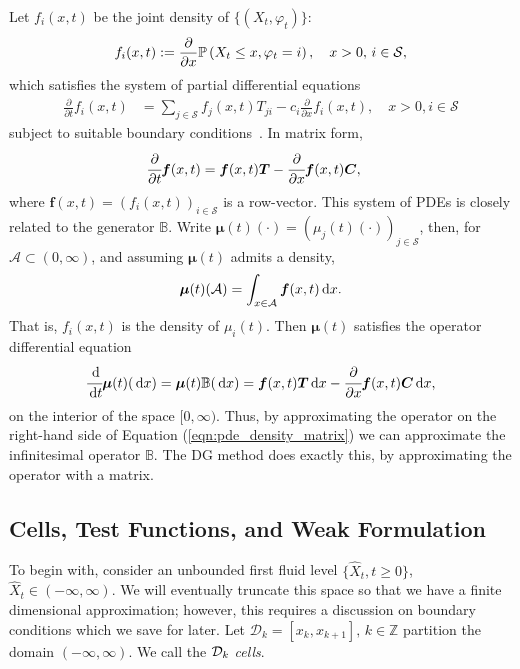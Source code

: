 Let $f_i(x,t)$ be the joint density of $\{(X_t, \varphi_t)\}$: 
	\begin{align*} 
	    f_i(x,t) := \frac{\partial}{\partial x} 	\mathbb{P}\left(X_t \leq x, \varphi_t = i\right),\quad x>0,\, i \in\mathcal{S},
	\end{align*} 
which satisfies the system of partial differential equations 
%
\begin{align*}
\frac{\partial}{\partial t} f_i(x,t)& = \sum_{j\in \mathcal{S}}  f_j(x,t)T_{ji} - c_i \frac{\partial}{\partial x} f_i(x,t), \quad x>0, i\in\mathcal S
\end{align*}
% 
subject to suitable boundary conditions~\citep{bo2014}. In matrix form, 
\begin{align}
\cfrac{\partial}{\partial t} \boldsymbol f(x,t) &= \boldsymbol f(x,t)\boldsymbol T -  \cfrac{\partial}{\partial x}\boldsymbol f(x,t)\boldsymbol C\label{eqn:pde_density_matrix}, 
\end{align}
where \(\boldsymbol f(x,t) = \left(f_i(x,t)\right)_{i\in\mathcal S}\) is a row-vector. 
This system of PDEs is closely related to the generator \(\mathbb B\). Write \(\boldsymbol \mu(t)(\cdot) = (\mu_j(t)(\cdot))_{j\in\mathcal S}\), then, for \(\mathcal A\subset (0,\infty)\), and assuming \(\boldsymbol \mu(t)\) admits a density, 
\begin{align*}
	\boldsymbol \mu(t)(\mathcal A) = \int_{x\in\mathcal A}\boldsymbol f(x,t)\, \mathrm{d} x.
\end{align*}
That is, \(f_i(x,t)\) is the density of \(\mu_i(t)\). 
Then \(\boldsymbol \mu(t)\) satisfies the operator differential equation
\begin{align*}
	\cfrac{\, \mathrm{d}}{\, \mathrm{d} t}\boldsymbol \mu(t)(\, \mathrm{d} x) = \boldsymbol \mu(t)\mathbb B(\, \mathrm{d} x) = \boldsymbol f(x,t)\boldsymbol T\, \mathrm{d} x - \cfrac{\partial}{\partial x}\boldsymbol f(x,t)\boldsymbol C\, \mathrm{d} x,
\end{align*}
on the interior of the space \([0,\infty)\). Thus, by approximating the operator on the right-hand side of Equation (\ref{eqn:pde_density_matrix}) we can approximate the infinitesimal operator \(\mathbb B\). The DG method does exactly this, by approximating the operator with a matrix.

\subsection{Cells, Test Functions, and Weak Formulation}
To begin with, consider an unbounded first fluid level \(\{\widehat X_t,t\geq0\}\), \(\widehat X_t\in(-\infty,\infty)\). We will eventually truncate this space so that we have a finite dimensional approximation; however, this requires a discussion on boundary conditions which we save for later. Let \(\mathcal D_k = [x_k,x_{k+1}],\, k\in\mathbb Z\) partition the domain \((-\infty,\infty)\). We call the \(\mathcal{D}_k\) \textit{cells}. 

